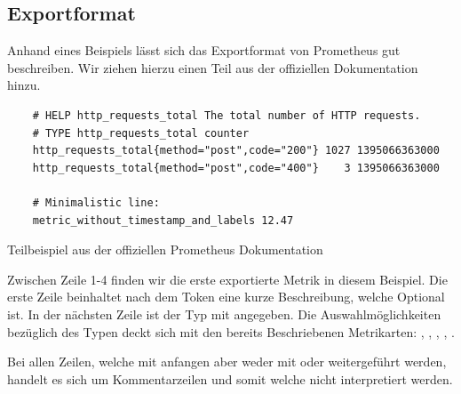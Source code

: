 \subsection{Exportformat}
Anhand eines Beispiels lässt sich das Exportformat von Prometheus gut beschreiben. Wir ziehen hierzu einen Teil aus der offiziellen Dokumentation~\cite{PrometheusExpositionFormatBeispiel} hinzu.\\
\par
\label{subsec:Exportformat}
\begin{listing}[H]
	\begin{verbatim}
	# HELP http_requests_total The total number of HTTP requests.
	# TYPE http_requests_total counter
	http_requests_total{method="post",code="200"} 1027 1395066363000
	http_requests_total{method="post",code="400"}    3 1395066363000
	
	# Minimalistic line:
	metric_without_timestamp_and_labels 12.47
	\end{verbatim}
	\caption{Teilbeispiel aus der offiziellen Prometheus Dokumentation~\cite{PrometheusExpositionFormatBeispiel}}
\end{listing}
Zwischen Zeile 1-4 finden wir die erste exportierte Metrik in diesem Beispiel. Die erste Zeile beinhaltet nach dem Token  eine kurze Beschreibung, welche Optional ist. In der nächsten Zeile ist der Typ mit\linebreak {} angegeben. Die Auswahlmöglichkeiten bezüglich des Typen deckt sich mit den bereits Beschriebenen Metrikarten: , , , , .

Bei allen Zeilen, welche mit \promcode{#} anfangen aber weder mit  oder  weitergeführt werden, handelt es sich um Kommentarzeilen und somit welche nicht interpretiert werden.

